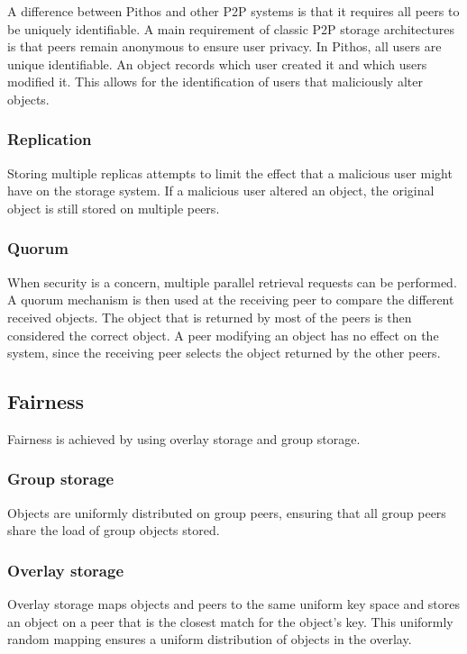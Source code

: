 A difference between Pithos and other P2P systems is that it requires all peers to be uniquely identifiable. A main requirement of classic P2P storage architectures is that peers remain anonymous to ensure user privacy. In Pithos, all users are unique identifiable. An object records which user created it and which users modified it. This allows for the identification of users that maliciously alter objects.

\subsubsection{Replication}

Storing multiple replicas attempts to limit the effect that a malicious user might have on the storage system. If a malicious user altered an object, the original object is still stored on multiple peers.

\subsubsection{Quorum}

When security is a concern, multiple parallel retrieval requests can be performed. A quorum mechanism is then used at the receiving peer to compare the different received objects. The object that is returned by most of the peers is then considered the correct object. A peer modifying an object has no effect on the system, since the receiving peer selects the object returned by the other peers.

\subsection{Fairness}

Fairness is achieved by using overlay storage and group storage.

\subsubsection{Group storage}

Objects are uniformly distributed on group peers, ensuring that all group peers share the load of group objects stored.

\subsubsection{Overlay storage}

Overlay storage maps objects and peers to the same uniform key space and stores an object on a peer that is the closest match for the object's key. This uniformly random mapping ensures a uniform distribution of objects in the overlay.


